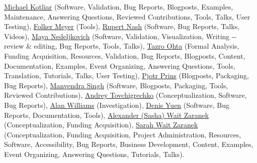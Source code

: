 \documentclass[sigconf,authordraft]{acmart}
\newcommand{\contributor}[3]
{\normalsize\href{#1}{#2} \small(#3)\normalsize}
\begin{document}
\begin{acks}
\contributor{https://orcid.org/0000-0002-6486-3898}{Michael Kotliar}{Software, Validation, Bug Reports, Blogposts, Examples, Maintenance, Answering Questions, Reviewed Contributions, Tools, Talks, User Testing},
\contributor{https://orcid.org/0000-0003-1112-2284}{Folker Meyer}{Tools},
\contributor{https://orcid.org/0000-0002-6388-7353}{Rupert Nash}{Software, Bug Reports, Talks, Videos},
\contributor{https://orcid.org/0000-0003-3705-948X}{Maya Nedeljkovich}{Software, Validation, Visualization, Writing -\/- review \& editing, Bug Reports, Tools, Talks},
\contributor{https://orcid.org/0000-0003-3777-5945}{Tazro Ohta}{Formal Analysis, Funding Acquisition, Resources, Validation, Bug Reports, Blogposts, Content, Documentation, Examples, Event Organizing, Answering Questions, Tools, Translation, Tutorials, Talks, User Testing},
\contributor{https://orcid.org/0000-0002-8021-9162}{Pjotr Prins}{Blogposts, Packaging, Bug Reports},
\contributor{https://orcid.org/0000-0001-9279-9910}{Manvendra Singh}{Software, Blogposts, Packaging, Tools, Reviewed Contributions},
\contributor{https://orcid.org/0000-0002-0959-4429}{Andrey Tovchigrechko}{Conceptualization, Software, Bug Reports},
\contributor{https://orcid.org/0000-0003-3156-2105}{Alan Williams}{Investigation},
\contributor{https://orcid.org/0000-0002-6130-1021}{Denis Yuen}{Software, Bug Reports, Documentation, Tools},
\contributor{https://orcid.org/0000-0002-0415-9655}{Alexander (Sasha) Wait Zaranek}{Conceptualization, Funding Acquisition},
\contributor{https://orcid.org/0000-0003-4716-9121}{Sarah Wait Zaranek}{Conceptualization, Funding Acquisition, Project Administration, Resources, Software, Accessibility, Bug Reports, Business Development, Content, Examples, Event Organizing, Answering Questions, Tutorials, Talks}.


\end{acks}
\end{document}

